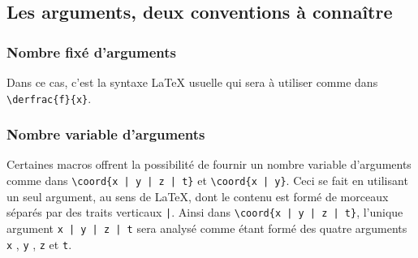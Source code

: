\documentclass[12pt,a4paper]{article}
\begin{document}
\subsection{Les arguments, deux conventions à connaître}

\subsubsection{Nombre fixé d'arguments}

Dans ce cas, c'est la syntaxe \LaTeX{} usuelle qui sera à utiliser comme dans \verb+\derfrac{f}{x}+.



\subsubsection{Nombre variable d'arguments}

Certaines macros offrent la possibilité de fournir un nombre variable d'arguments comme dans \verb+\coord{x | y | z | t}+ et \verb+\coord{x | y}+.
Ceci se fait en utilisant un seul argument, au sens de \LaTeX{}, dont le contenu est formé de morceaux séparés par des traits verticaux \verb+|+.
Ainsi dans \verb+\coord{x | y | z | t}+, l'unique argument \verb+x | y | z | t+ sera analysé comme étant formé des quatre arguments \verb+x+ , \verb+y+ , \verb+z+ et \verb+t+.
\end{document}
